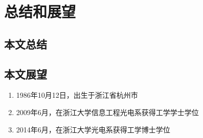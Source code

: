\documentclass{ZJUthesis}
\begin{document}
\chapter{总结和展望}

\section{本文总结}

\section{本文展望}

\ZJUbackmatter

\begin{resume}
\begin{enumerate}
\item{1986年10月12日，出生于浙江省杭州市}
\item{2009年6月，在浙江大学信息工程光电系获得工学学士学位}
\item{2014年6月，在浙江大学光电系获得工学博士学位}
\end{enumerate}
\end{resume}
\end{document}
